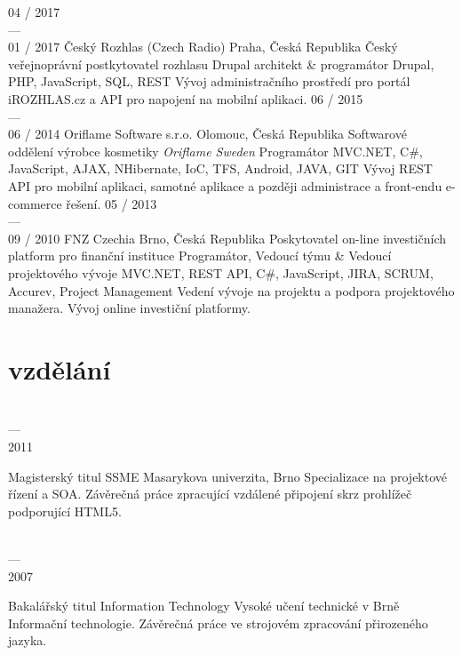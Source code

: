 \documentclass[]{friggeri-cv} %
\begin{document}
\begin{entrylist}
  \job
  {04 / 2017 \\ --- \\ 01 / 2017}
  {Český Rozhlas (Czech Radio)}
  {Praha, Česká Republika}
  {Český veřejnoprávní postkytovatel rozhlasu}
  {
    \position
      {Drupal architekt \& programátor}
      {Drupal, PHP, JavaScript, SQL, REST}
      {
        Vývoj administračního prostředí pro portál iROZHLAS.cz a API pro napojení na mobilní aplikaci.
      }
  }
  \job
  {06 / 2015 \\ --- \\ 06 / 2014}
  {Oriflame Software s.r.o.}
  {Olomouc, Česká Republika}
  {Softwarové oddělení výrobce kosmetiky \emph{Oriflame Sweden}}
  {
    \position
    {Programátor}
    {MVC.NET, C\#, JavaScript, AJAX, NHibernate, IoC, TFS, Android, JAVA, GIT}
    {Vývoj REST API pro mobilní aplikaci, samotné aplikace a později administrace a front-endu e-commerce řešení.}
  }
  \job
  {05 / 2013 \\ --- \\ 09 / 2010}
  {FNZ Czechia}
  {Brno, Česká Republika}
  {Poskytovatel on-line investičních platform pro finanční instituce}
  {
    \position
    {Programátor, Vedoucí týmu \& Vedoucí projektového vývoje}
    {MVC.NET, REST API, C\#, JavaScript, JIRA, SCRUM, Accurev, Project Management}
    {Vedení vývoje na projektu a podpora projektového manažera. Vývoj online investiční platformy.}
  }
\end{entrylist}

\section{vzdělání}

\begin{entrylist}
  \entry
  {\parbox[t]{2cm}{ \\ --- \\ 2011}}
  {Magisterský titul {\normalfont SSME}}
  {Masarykova univerzita, Brno}
  {
    \thesis
    {Specializace na projektové řízení a SOA.}
    {Závěrečná práce zpracující vzdálené připojení skrz prohlížeč podporující HTML5.}
  }
  \entry
  {\parbox[t]{2cm}{ \\ --- \\ 2007}}
  {Bakalářský titul {\normalfont Information Technology}}
  {Vysoké učení technické v Brně}
  {
    \thesis
    {Informační technologie.}
    {Závěrečná práce ve strojovém zpracování přirozeného jazyka.}
  }
\end{entrylist}
\end{document}
